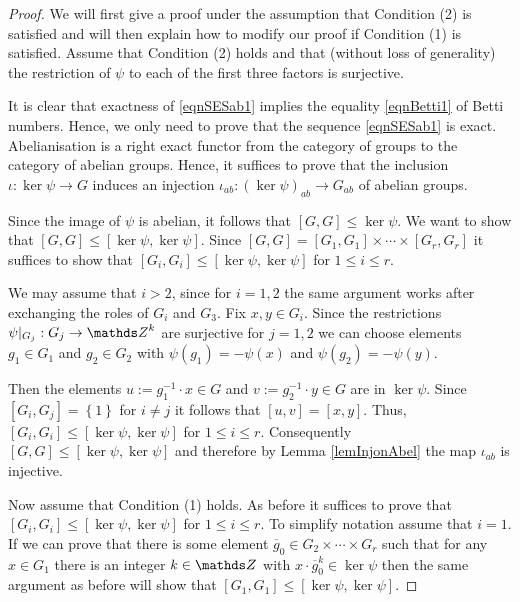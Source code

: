 \begin{proof}
 We will first give a proof under the assumption that Condition (2) is satisfied and will then explain how to modify our proof if Condition (1) is satisfied. Assume that Condition (2) holds and that (without loss of generality) the restriction of $\psi$ to each of the first three factors is surjective.
 
 It is clear that exactness of \eqref{eqnSESab1} implies the equality \eqref{eqnBetti1} of Betti numbers. Hence, we only need to prove that the sequence \eqref{eqnSESab1} is exact. Abelianisation is a right exact functor from the category of groups to the category of abelian groups. Hence, it suffices to prove that the inclusion $\iota : \ker \psi \rightarrow G$ induces an injection $\iota _{ab} : (\ker \psi)_{ab}\rightarrow G_{ab}$ of abelian groups.
 
 Since the image of $\psi$ is abelian, it follows that $\left[G,G\right]\leq \ker \psi$. We want to show that $\left[G,G\right]\leq \left[\ker\psi,\ker\psi\right]$. Since $\left[G,G\right]=\left[G_1,G_1\right]\times \cdots \times \left[G_r,G_r\right]$ it suffices to show that $\left[G_i,G_i\right]\leq \left[\ker\psi,\ker\psi\right]$ for $1\leq i \leq r$.
 
 We may assume that $i>2$, since for $i=1,2$ the same argument works after exchanging the roles of $G_i$ and $G_3$. Fix $x,y\in G_i$. Since the restrictions $\psi|_{G_j}:G_j\rightarrow \ZZ^k$ are surjective for $j=1,2$ we can choose elements $g_1\in G_1$ and $g_2 \in G_2$ with $\psi(g_1)=-\psi(x)$ and $\psi(g_2)=-\psi(y)$. 
 
 Then the elements $u:=g_1^{-1}\cdot x\in G$ and $v:=g_2^{-1}\cdot y\in G$ are in $\ker \psi$. Since $\left[G_i,G_j\right]=\left\{1\right\}$ for $i\neq j$ it follows that $\left[u,v\right]=\left[x,y\right]$. Thus, $\left[G_i,G_i\right]\leq \left[\ker\psi,\ker\psi\right]$ for $1\leq i \leq r$. Consequently $\left[G,G\right]\leq \left[\ker\psi,\ker\psi\right]$ and therefore by Lemma \ref{lemInjonAbel} the map $\iota_{ab}$ is injective.
 
 Now assume that Condition (1) holds. As before it suffices to prove that $\left[G_i,G_i\right]\leq \left[\ker \psi,\ker\psi\right]$ for $1\leq i \leq r$. To simplify notation assume that $i=1$. If we can prove that there is some element $\overline{g}_0\in G_2\times \cdots \times G_r$ such that for any $x\in G_1$ there is an integer $k\in \ZZ$ with $x\cdot \overline{g}_0^k \in \ker \psi$ then the same argument as before will show that $\left[G_1,G_1\right]\leq \left[\ker \psi,\ker\psi\right]$.
 

\end{proof}

